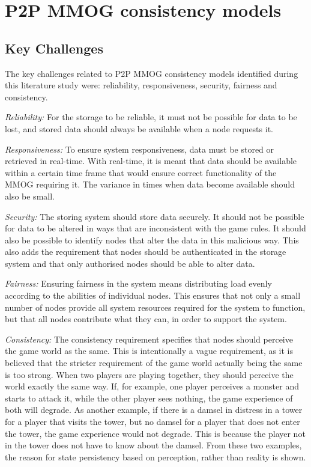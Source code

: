 \documentclass[10pt,a4paper,journal,cspaper,compsoc]{IEEEtran}
\begin{document}
\section{P2P MMOG consistency models}
\label{p2p_mmog_models}

\subsection{Key Challenges}
\label{key_challenges_cm}

The key challenges related to P2P MMOG consistency models identified during this literature study were: reliability, responsiveness, security,
fairness and consistency.


\emph{Reliability:} For the storage to be reliable, it must not be possible for data to be lost, and stored data should always be available when a
    node requests it.

\emph{Responsiveness:} To ensure system responsiveness, data must be stored or retrieved in real-time. With real-time, it is meant that data
    should be available within a certain time frame that would ensure correct functionality of the MMOG requiring it. The variance in times when
    data become available should also be small.

\emph{Security:} The storing system should store data securely. It should not be possible for data to be altered in ways that are inconsistent
    with the game rules. It should also be possible to identify nodes that alter the data in this malicious way. This also adds the requirement
    that nodes should be authenticated in the storage system and that only authorised nodes should be able to alter data.

\emph{Fairness:} Ensuring fairness in the system means distributing load evenly according to the abilities of individual nodes. This ensures that
    not only a small number of nodes provide all system resources required for the system to function, but that all nodes contribute what they
    can, in order to support the system.

\emph{Consistency:} The consistency requirement specifies that nodes should perceive the game world as the same. This is intentionally a vague
    requirement, as it is believed that the stricter requirement of the game world actually being the same is too strong. When two players are
    playing together, they should perceive the world exactly the same way. If, for example, one player perceives a monster and starts to attack
    it, while the other player sees nothing, the game experience of both will degrade. As another example, if there is a damsel in distress in a
    tower for a player that visits the tower, but no damsel for a player that does not enter the tower, the game experience would not degrade.
    This is because the player not in the tower does not have to know about the damsel. From these two examples, the reason for state persistency
    based on perception, rather than reality is shown.
\end{document}
